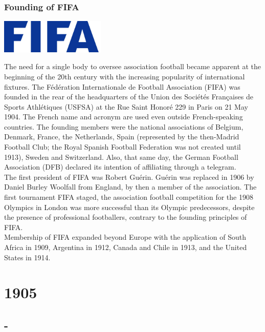 \documentclass[11pt]{report}
\begin{document}
\subsection{Founding of FIFA}
\vspace{2mm}\begin{center}\includegraphics[width=5cm]{./img/fifaLogo.jpg}\end{center}
The need for a single body to oversee association football became apparent at the beginning of the 20th century with the increasing popularity of international fixtures. The Fédération Internationale de Football Association (FIFA) was founded in the rear of the headquarters of the Union des Sociétés Françaises de Sports Athlétiques (USFSA) at the Rue Saint Honoré 229 in Paris on 21 May 1904. The French name and acronym are used even outside French-speaking countries. The founding members were the national associations of Belgium, Denmark, France, the Netherlands, Spain (represented by the then-Madrid Football Club; the Royal Spanish Football Federation was not created until 1913), Sweden and Switzerland. Also, that same day, the German Football Association (DFB) declared its intention of affiliating through a telegram.\\
\indent The first president of FIFA was Robert Guérin. Guérin was replaced in 1906 by Daniel Burley Woolfall from England, by then a member of the association. The first tournament FIFA staged, the association football competition for the 1908 Olympics in London was more successful than its Olympic predecessors, despite the presence of professional footballers, contrary to the founding principles of FIFA.\\ \indent Membership of FIFA expanded beyond Europe with the application of South Africa in 1909, Argentina in 1912, Canada and Chile in 1913, and the United States in 1914.

\chapter{1905}
\section{-}
\end{document}
